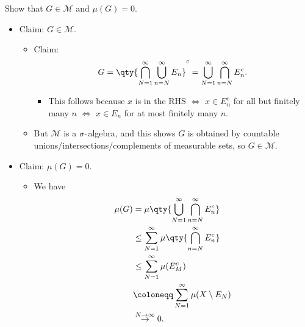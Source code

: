 Show that \(G \in \mathcal M\) and \(\mu(G) = 0\).


\begin{solution}

\envlist

\begin{itemize}
\item
  Claim: \(G\in {\mathcal{M}}\).

  \begin{itemize}
  \item
    Claim:
    \begin{align*}  
    G = \qty{ \displaystyle\bigcap_{N=1}^\infty \displaystyle\bigcup_{n=N}^\infty E_n}^c = \displaystyle\bigcup_{N=1}^\infty \displaystyle\bigcap_{n=N}^\infty E_n^c
    .\end{align*}

    \begin{itemize}
    \tightlist
    \item
      This follows because \(x\) is in the RHS \(\iff\) \(x\in E_n^c\)
      for all but finitely many \(n\) \(\iff\) \(x\in E_n\) for at most
      finitely many \(n\).
    \end{itemize}
  \item
    But \({\mathcal{M}}\) is a \(\sigma{\hbox{-}}\)algebra, and this
    shows \(G\) is obtained by countable
    unions/intersections/complements of measurable sets, so
    \(G\in {\mathcal{M}}\).
  \end{itemize}
\item
  Claim: \(\mu(G) = 0\).

  \begin{itemize}
  \tightlist
  \item
    We have
    \begin{align*}  
    \mu(G)
    &= \mu\qty{\displaystyle\bigcup_{N=1}^\infty \displaystyle\bigcap_{n=N}^\infty E_n^c} \\
    &\leq \sum_{N=1}^\infty \mu \qty{\displaystyle\bigcap_{n=N}^\infty E_n^c}  \\
    &\leq \sum_{N=1}^\infty \mu(E_M^c) \\ 
    &\coloneqq\sum_{N=1}^\infty \mu(X\setminus E_N) \\
    &\overset{N\to\infty}\to 0
    .\end{align*}
  \end{itemize}
\end{itemize}


\end{solution}

